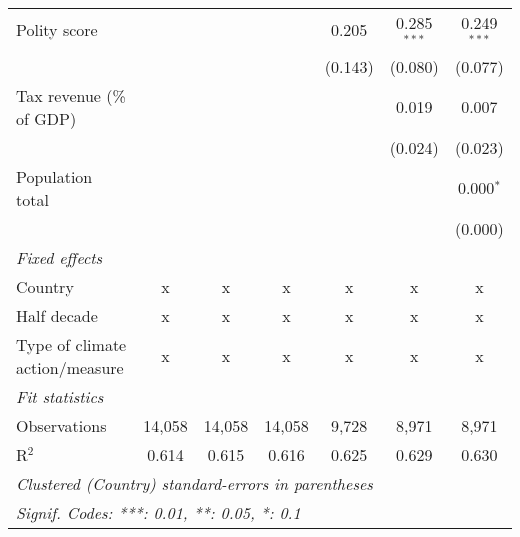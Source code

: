 \begin{tabular}{lcccccc}
   Polity score                                                   &             &                &                & 0.205          & 0.285$^{***}$  & 0.249$^{***}$\\   
                                                                  &             &                &                & (0.143)        & (0.080)        & (0.077)\\   
   Tax revenue (\% of GDP)                                        &             &                &                &                & 0.019          & 0.007\\   
                                                                  &             &                &                &                & (0.024)        & (0.023)\\   
   Population total                                               &             &                &                &                &                & 0.000$^{*}$\\   
                                                                  &             &                &                &                &                & (0.000)\\   
   \emph{Fixed effects}\\
   Country                                                        & x           & x              & x              & x              & x              & x\\  
   Half decade                                                    & x           & x              & x              & x              & x              & x\\  
   Type of climate action/measure                                 & x           & x              & x              & x              & x              & x\\  
   \midrule \emph{Fit statistics}\\
   Observations                                                   & 14,058      & 14,058         & 14,058         & 9,728          & 8,971          & 8,971\\  
   R$^2$                                                          & 0.614       & 0.615          & 0.616          & 0.625          & 0.629          & 0.630\\  
   \midrule
   \multicolumn{7}{l}{\emph{Clustered (Country) standard-errors in parentheses}}\\
   \multicolumn{7}{l}{\emph{Signif. Codes: ***: 0.01, **: 0.05, *: 0.1}}\\
\end{tabular}
\par\endgroup


